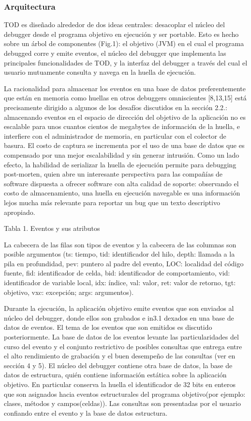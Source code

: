 \documentclass[12pt,legalpaper]{report}
\begin{document}
			\subsubsection{Arquitectura}

TOD es diseñado alrededor de dos ideas centrales: desacoplar el núcleo del debugger desde el programa objetivo en ejecución y ser portable.  Esto es hecho sobre un árbol de componentes (Fig.1):  el objetivo (JVM) en el cual el programa debugged corre y emite eventos, el núcleo del debugger que implementa las principales funcionalidades de TOD, y la interfaz del debugger a través del cual el usuario mutuamente consulta y navega en la huella de ejecución.

La racionalidad para almacenar los eventos en una base de datos preferentemente que están en memoria como huellas en otros debuggers omniscientes [8,13,15] está precisamente dirigido a algunos de los desafíos discutidos en la sección 2.2.:  almacenando eventos en el espacio de dirección del  objetivo de la aplicación no es escalable para unos cuantos cientos de megabytes de información de la huella, e interfiere con el administrador de memoria, en particular con el colector de basura.  El costo de captura se incrementa por el uso de una base de datos que es compensado por una mejor escalabilidad y sin generar intrusión.  Como un lado efecto, la habilidad de serializar la huella de ejecución permite para debugging post-morten, quien abre un interesante perspectiva para las compañías de software dispuesta a ofrecer software con alta calidad de soporte:  observando el costo de almacenamiento, una huella en ejecución navegable es una información lejos mucha más relevante para reportar un bug que un texto descriptivo apropiado. 

Tabla 1.  Eventos y sus atributos

La cabecera de las filas son tipos de eventos y la cabecera de las columnas son posible argumentos (ts: tiempo, tid: identificador del hilo, depth: llamada a la pila en profundidad, pev: puntero al padre del evento, LOC: localidad del código fuente, fid: identificador de celda, bid: identificador de comportamiento, vid: identificador de variable local, idx: índice, val: valor, ret: valor de retorno, tgt: objetivo, vxc: excepción; args: argumentos).

Durante la ejecución, la aplicación objetivo emite eventos que son enviados al núcleo del debugger, donde ellos son grabados e in3.1 dexados en una base de datos de eventos.  El tema de los eventos que son emitidos es discutido posteriormente.  La base de datos de los eventos levante las particularidades del curso del evento y el conjunto restrictivo de posibles consultas que entrega entre el alto rendimiento de grabación y el buen desempeño de las consultas (ver en sección 4 y 5).  El núcleo del debugger contiene otra base de datos, la base de datos de estructura, quién contiene información estática sobre la aplicación objetivo.  En particular conserva la huella el identificador de 32 bits en enteros que son asignados hacia eventos estructurales del programa objetivo(por ejemplo: clases, métodos y campos(celdas)).  Las consultas son presentadas por el usuario confiando entre el evento y la base de datos estructura.
\end{document}

